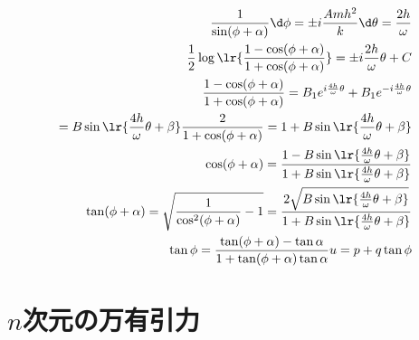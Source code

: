	\begin{align*}
		\frac{1}{\sin(\phi + \alpha)}\d\phi = \pm i\frac{Amh^2}{k}\d\theta = \frac{2h}{\omega}\\
		\frac{1}{2}\log\lr{\frac{1 - \cos(\phi + \alpha)}{1 + \cos(\phi + \alpha)}} = \pm i\frac{2h}{\omega}\theta + C\\
		\frac{1 - \cos(\phi + \alpha)}{1 + \cos(\phi + \alpha)} = B_1e^{i\frac{4h}{\omega}\theta} + B_1e^{-i\frac{4h}{\omega}\theta}\\
		= B\sin\lr{\frac{4h}{\omega}\theta + \beta}
		\frac{2}{1 + \cos(\phi + \alpha)} = 1 + B\sin\lr{\frac{4h}{\omega}\theta + \beta}\\
		\cos(\phi + \alpha) = \frac{1 - B\sin\lr{\frac{4h}{\omega}\theta + \beta}}{1 + B\sin\lr{\frac{4h}{\omega}\theta + \beta}}\\
		\tan(\phi + \alpha) = \sqrt{\frac{1}{\cos^2(\phi + \alpha)} - 1} = \frac{2\sqrt{B\sin\lr{\frac{4h}{\omega}\theta + \beta}}}{1 + B\sin\lr{\frac{4h}{\omega}\theta + \beta}}\\
		\tan\phi = \frac{\tan(\phi + \alpha) - \tan\alpha}{1 + \tan(\phi + \alpha)\tan\alpha}
		u = p + q\tan\phi
	\end{align*}

\section{$n$次元の万有引力}